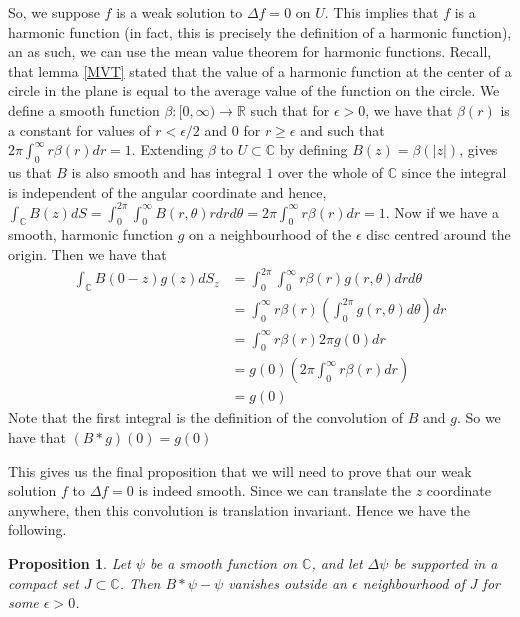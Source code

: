 \documentclass[11pt]{report}
\newtheorem{prop}[thm]{Proposition}
\theoremstyle{definition}
\begin{document}
So, we suppose $f$ is a weak solution to $\Delta f = 0$ on $U$. This implies that $f$ is a harmonic function (in fact, this is precisely the definition of a harmonic function), an as such, we can use the mean value theorem for harmonic functions. Recall, that lemma \ref{MVT} stated that the value of a harmonic function at the center of a circle in the plane is equal to the average value of the function on the circle. We define a smooth function $\beta:[0,\infty)\rightarrow \mathbb{R}$ such that for $\epsilon > 0$, we have that $\beta(r)$ is a constant for values of $r < \epsilon / 2$ and $0$ for $r \geq \epsilon$ and such that $2\pi \int_0^{\infty}r\beta(r)dr = 1$. Extending $\beta$ to $U \subset \mathbb{C}$ by defining $B(z)=\beta(|z|)$, gives us that $B$ is also smooth and has integral $1$ over the whole of $\mathbb{C}$ since the integral is independent of the angular coordinate and hence, $\int_{\mathbb{C}}B(z)dS=\int_0^{2\pi}\int_0^{\infty}B(r,\theta)rdrd\theta = 2\pi\int_0^{\infty}r\beta(r)dr = 1$. Now if we have a smooth, harmonic function $g$ on a neighbourhood of the $\epsilon$ disc centred around the origin. Then we have that 
\begin{align*}
  \int_{\mathbb{C}}B(0-z)g(z)dS_z &= \int_0^{2\pi}\int_0^{\infty}r\beta(r)g(r,\theta)drd\theta \\
  &= \int_0^{\infty}r\beta(r)\left(\int_0^{2\pi}g(r,\theta)d\theta\right) dr \\
  &= \int_0^{\infty}r\beta(r)2\pi g(0) dr \\
  &= g(0)\left(2\pi\int_0^{\infty}r\beta(r)dr\right) \\
  &=g(0)
\end{align*}
Note that the first integral is the definition of the convolution of $B$ and $g$. So we have that $(B*g)(0) = g(0)$

This gives us the final proposition that we will need to prove that our weak solution $f$ to $\Delta f = 0$ is indeed smooth. Since we can translate the $z$ coordinate anywhere, then this convolution is translation invariant. Hence we have the following.

\begin{prop}
  Let $\psi$ be a smooth function on $\mathbb{C}$, and let $\Delta \psi$ be supported in a compact set $J \subset \mathbb{C}$. Then $B*\psi - \psi$ vanishes outside an $\epsilon$ neighbourhood of $J$ for some $\epsilon > 0$.
\end{prop}
\end{document}
